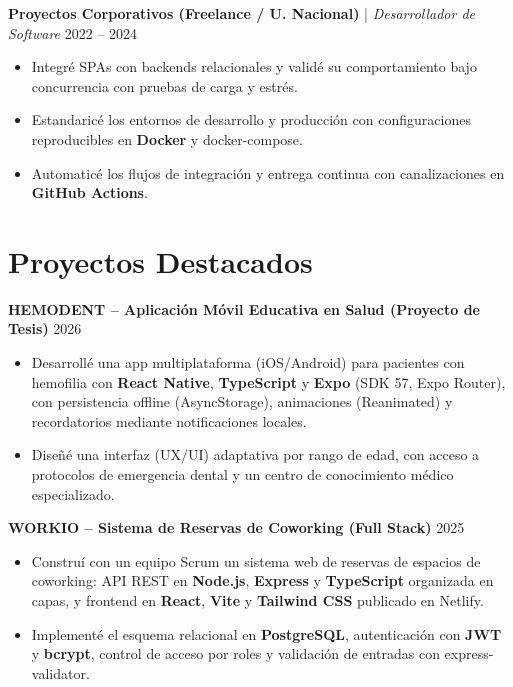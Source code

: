 \documentclass[11pt,a4paper]{article}
\begin{document}
\vspace{0.2cm}

\noindent
\textbf{Proyectos Corporativos (Freelance / U. Nacional)} | \textit{Desarrollador de Software} \hfill 2022 – 2024
\begin{itemize}[leftmargin=*, noitemsep, topsep=2pt]
    \item Integré SPAs con backends relacionales y validé su comportamiento bajo concurrencia con pruebas de carga y estrés.
    \item Estandaricé los entornos de desarrollo y producción con configuraciones reproducibles en \textbf{Docker} y docker-compose.
    \item Automaticé los flujos de integración y entrega continua con canalizaciones en \textbf{GitHub Actions}.
\end{itemize}

\section*{Proyectos Destacados}

\noindent
\textbf{HEMODENT – Aplicación Móvil Educativa en Salud (Proyecto de Tesis)} \hfill 2026
\begin{itemize}[leftmargin=*, noitemsep, topsep=2pt]
    \item Desarrollé una app multiplataforma (iOS/Android) para pacientes con hemofilia con \textbf{React Native}, \textbf{TypeScript} y \textbf{Expo} (SDK 57, Expo Router), con persistencia offline (AsyncStorage), animaciones (Reanimated) y recordatorios mediante notificaciones locales.
    \item Diseñé una interfaz (UX/UI) adaptativa por rango de edad, con acceso a protocolos de emergencia dental y un centro de conocimiento médico especializado.
\end{itemize}

\vspace{0.2cm}

\noindent
\textbf{WORKIO – Sistema de Reservas de Coworking (Full Stack)} \hfill 2025
\begin{itemize}[leftmargin=*, noitemsep, topsep=2pt]
    \item Construí con un equipo Scrum un sistema web de reservas de espacios de coworking: API REST en \textbf{Node.js}, \textbf{Express} y \textbf{TypeScript} organizada en capas, y frontend en \textbf{React}, \textbf{Vite} y \textbf{Tailwind CSS} publicado en Netlify.
    \item Implementé el esquema relacional en \textbf{PostgreSQL}, autenticación con \textbf{JWT} y \textbf{bcrypt}, control de acceso por roles y validación de entradas con express-validator.
\end{itemize}
\end{document}
